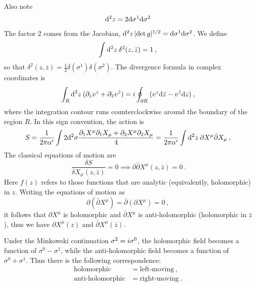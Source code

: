 Also note    
\begin{equation}
	\mathrm{d}^{2} z=2 \mathrm{d} \sigma^{1} \mathrm{d} \sigma^{2}
\end{equation}
The factor 2 comes from the Jacobian, $\mathrm{d}^{2} z\, \lvert \operatorname{det} g\rvert^{1/2}= \mathrm{d} \sigma^{1} \mathrm{d} \sigma^{2}$.    
We define    
\begin{equation}
	\int \mathrm{d}^{2} z \: \delta^{2}(z, \bar{z})=1 \:,
\end{equation}
so that $\delta^{2}(z, \bar{z})=\tfrac{1}{2} \delta(\sigma^{1}) \delta(\sigma^{2})$.    
The divergence formula in complex coordinates is    
\begin{equation}
	\int_{R} \mathrm{d}^{2}z\: (\partial_{z} v^{z}+\partial_{\bar{z}} v^{\bar{z}} )= i \oint_{\partial R}\: (v^{z} \mathrm{d} \bar{z}-v^{\bar{z}} \mathrm{d} z ) \:, \label{2.1.9}
\end{equation}
where the integration contour runs counterclockwise around the boundary of the region $R$.    
In this sign convention, the action is    
\begin{equation}
	S=\frac{1}{2 \pi \alpha^{\prime}} \int 2\mathrm{d}^{2} \sigma\frac{\partial_1 X^{\mu}\partial_1 X_{\mu}+\partial_2X^{\mu}\partial_2X_{\mu}}{4}=\frac{1}{2 \pi \alpha^{\prime}} \int \mathrm{d}^{2} z\: \partial X^{\mu} \bar{\partial} X_{\mu} \:, \label{2.1.10}
\end{equation}
The classical equations of motion are    
\begin{equation}\
	\frac{\delta S}{\delta X_{\mu}(z, \bar{z})}=0\implies\partial \bar{\partial} X^{\mu}(z, \bar{z})=0 \:. \label{2.1.11}
\end{equation}
Here $f(z)$ refers to those functions that are analytic (equivalently, holomorphic) in $z$.    
Writing the equations of motion as    
\begin{equation}
	\partial(\bar{\partial} X^{\mu})=\bar{\partial}(\partial X^{\mu})=0 \:, \label{2.1.12}
\end{equation}
it follows that $\partial X^{\mu}$ is holomorphic and $\bar{\partial} X^{\mu}$ is anti-holomorphic (holomorphic in $\bar{z}$), thus we have $\partial X^{\mu}(z)$ and $\bar{\partial} X^{\mu}(\bar{z})$.    

Under the Minkowski continuation $\sigma^{2}=i \sigma^{0}$, the holomorphic field becomes a function of $\sigma^{0}-\sigma^{1}$, while the anti-holomorphic field becomes a function of $\sigma^{0}+\sigma^{1}$.    
Thus there is the following correspondence:    
\begin{subequations}
	\begin{align}
		{\text{holomorphic}}&=\text {left-moving}  \:,\\
		{\text{anti-holomorphic}}&=\text {right-moving} \:.
	\end{align}
\end{subequations}


